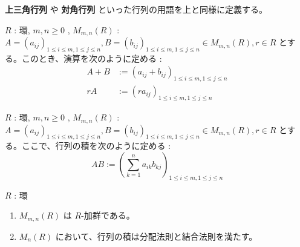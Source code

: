 \documentclass[article,paper=a4paper]{jlreq}
\begin{document}
\begin{rem}
  \textbf{上三角行列} や \textbf{対角行列} といった行列の用語を上と同様に定義する。
\end{rem}

\begin{dfn}
  \quad $R$ : 環, $m, n \geq 0$ , $M_{m, n}(R)$ : $A = (a_{ij})_{1 \leq i \leq m, 1 \leq j \leq n}, B = (b_{ij})_{1 \leq i \leq m, 1 \leq j \leq n} \in M_{m, n}(R), r \in R$ とする。このとき、演算を次のように定める :
\begin{align*}
  A + B &:= (a_{ij} + b_{ij})_{1 \leq i \leq m, 1 \leq j \leq n} \\
  rA &:= (ra_{ij})_{1 \leq i \leq m, 1 \leq j \leq n}
\end{align*}
\end{dfn}

\begin{dfn}
  \quad $R$ : 環, $m, n \geq 0$ , $M_{m, n}(R)$ : $A = (a_{ij})_{1 \leq i \leq m, 1 \leq j \leq n}, B = (b_{ij})_{1 \leq i \leq m, 1 \leq j \leq n} \in M_{m, n}(R), r \in R$ とする。ここで、行列の積を次のように定める :
\[AB := \left(\sum_{k=1}^n a_{ik}b_{kj}\right)_{1 \leq i \leq m, 1 \leq j \leq n}\]
\end{dfn}

\begin{prop}
  \quad $R$ : 環
  \begin{enumerate}[label=(\arabic*)\,]
    \item $M_{m, n}(R)$ は $R$-加群である。
    \item $M_n(R)$ において、行列の積は分配法則と結合法則を満たす。
  \end{enumerate}
\end{prop}
\end{document}
